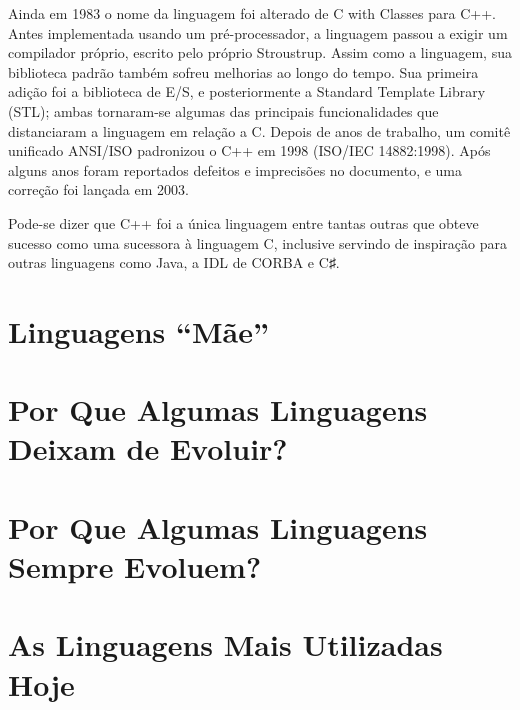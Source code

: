 \documentclass[
    12pt,               %
    openany,            %
    twoside,            %
    a4paper,            %
    brazil              %
    ]{abntex2}
\begin{document}
Ainda em 1983 o nome da linguagem foi alterado de C with Classes para C++.
Antes implementada usando um pré-processador, a linguagem passou a exigir um
compilador próprio, escrito pelo próprio Stroustrup. Assim como a linguagem,
sua biblioteca padrão também sofreu melhorias ao longo do tempo. Sua primeira
adição foi a biblioteca de E/S, e posteriormente a Standard Template Library
(STL); ambas tornaram-se algumas das principais funcionalidades que
distanciaram a linguagem em relação a C.  Depois de anos de trabalho, um comitê
unificado ANSI/ISO padronizou o C++ em 1998 (ISO/IEC 14882:1998). Após alguns
anos foram reportados defeitos e imprecisões no documento, e uma correção foi
lançada em 2003.

Pode-se dizer que C++ foi a única linguagem entre tantas outras que obteve
sucesso como uma sucessora à linguagem C, inclusive servindo de inspiração para
outras linguagens como Java, a IDL de CORBA e C♯.

\part{Linguagens “Mãe”}

\part{Por Que Algumas Linguagens Deixam de Evoluir?}

\part{Por Que Algumas Linguagens Sempre Evoluem?}

\part{As Linguagens Mais Utilizadas Hoje}


\end{document}
